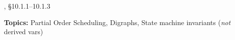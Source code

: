 \documentclass[handout]{mcs}
\begin{document}
\renewcommand{\reading}{Ch.\bref{digraphs_chapter}, Digraphs;
Ch.~\bref{state_machine_sec}, State Machines}, \S10.1.1--10.1.3


\begin{staffnotes}
\textbf{Topics:} Partial Order Scheduling, Digraphs, State machine
invariants (\emph{not} derived vars)
\end{staffnotes}















\iffalse


\pinput{PS_50_point_games}

\pinput{PS_koch_snowflake}

\pinput{PS_parenthesis_good_count} %

\fi


\end{document}
